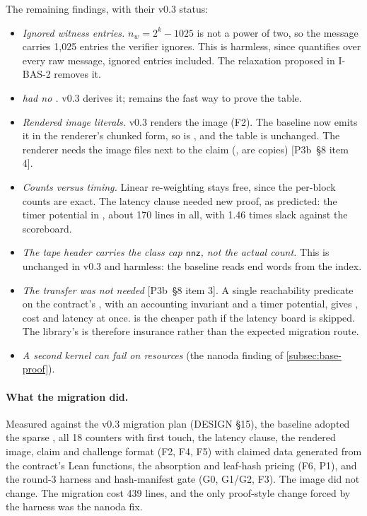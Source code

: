 The remaining findings, with their v0.3 status:
\begin{itemize}[nosep]
\item \emph{Ignored witness entries.} $n_w=2^k-1025$ is not a power of two, so the message carries
  1{,}025 entries the verifier ignores. This is harmless, since  quantifies over every raw
  message, ignored entries included. The relaxation proposed in I-BAS-2 removes it.
\item \emph{ had no .} v0.3 derives it;  remains the
  fast way to prove the  table.
\item \emph{Rendered image literals.} v0.3 renders the image (F2). The baseline now emits it in the
  renderer's chunked form, so  is , and the  table
  is unchanged. The renderer needs the image files next to the claim
  (,  are copies) [P3b~§8 item 4].
\item \emph{Counts versus timing.} Linear re-weighting stays free, since the per-block counts are
  exact. The latency clause needed new proof, as predicted: the timer potential in , about 170
  lines in all, with 1.46 times slack against the scoreboard.
\item \emph{The tape header carries the class cap $\mathsf{nnz}$, not the actual count.} This is
  unchanged in v0.3 and harmless: the baseline reads end words from the index.
\item \emph{The  transfer was not needed} [P3b~§8 item 3]. A single reachability predicate
  on the contract's , with an accounting invariant and a timer potential, gives
  , cost and latency at once.  is the cheaper path if the latency
  board is skipped. The library's  is therefore insurance rather than the expected
  migration route.
\item \emph{A second kernel can fail on resources} (the nanoda finding of \cref{subsec:base-proof}).
\end{itemize}

\paragraph{What the migration did.} Measured against the v0.3 migration plan (DESIGN §15), the
baseline adopted the sparse , all 18 counters with first touch, the latency clause, the
rendered image, claim and challenge format (F2, F4, F5) with claimed data generated from the
contract's Lean functions, the absorption and leaf-hash pricing (F6, P1), and the round-3 harness and
hash-manifest gate (G0, G1/G2, F3). The image did not change. The migration cost 439 lines, and the
only proof-style change forced by the harness was the nanoda fix.

